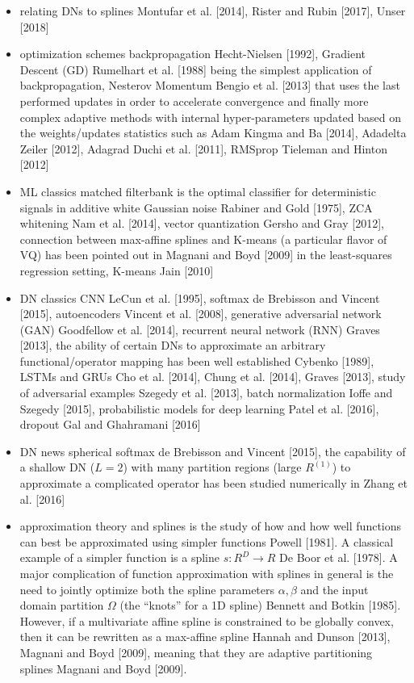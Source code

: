 \documentclass{article}
\begin{document}
\begin{itemize}
	\item relating DNs to splines
		\subitem Montufar et al. [2014], Rister and Rubin [2017], Unser [2018]
	\item optimization schemes
		\subitem backpropagation Hecht-Nielsen [1992], Gradient Descent (GD) Rumelhart et al. [1988] being the simplest application of backpropagation, Nesterov Momentum Bengio et al. [2013] that uses the last performed updates in order to accelerate convergence and finally more complex adaptive methods with internal hyper-parameters updated based on the weights/updates statistics such as Adam Kingma and Ba [2014], Adadelta Zeiler [2012], Adagrad Duchi et al. [2011], RMSprop Tieleman and Hinton [2012]
	\item ML classics
		\subitem matched filterbank is the optimal classifier for deterministic signals in additive white Gaussian noise Rabiner and Gold [1975], ZCA whitening Nam et al. [2014], vector quantization Gersho and Gray [2012], connection between max-affine splines and K-means (a particular flavor of VQ) has been pointed out in Magnani and Boyd [2009] in the least-squares regression setting, K-means Jain [2010]
	\item DN classics
		\subitem CNN LeCun et al. [1995], softmax de Brebisson and Vincent [2015], autoencoders Vincent et al. [2008], generative adversarial network (GAN) Goodfellow et al. [2014], recurrent neural network (RNN) Graves [2013], the ability of certain DNs to approximate an arbitrary functional/operator mapping has been well established Cybenko [1989],  LSTMs and GRUs Cho et al. [2014], Chung et al. [2014], Graves [2013], study of adversarial examples Szegedy et al. [2013], batch normalization Ioffe and Szegedy [2015], probabilistic models for deep learning Patel et al. [2016], dropout Gal and Ghahramani [2016]
	\item DN news
		\subitem spherical softmax  de Brebisson and Vincent [2015], the capability of a shallow DN ($L = 2$) with many partition regions (large $R^{(1)}$) to approximate a complicated operator has been studied numerically in Zhang et al. [2016]
	\item approximation theory and splines
		\subitem is the study of how and how well functions can best be approximated using simpler functions Powell [1981]. A classical example of a simpler function is a spline $s : R^D \rightarrow R$ De Boor et al. [1978]. A major complication of function approximation with splines in general is the need to jointly optimize both the spline parameters $\alpha, \beta$ and the input domain partition $\Omega$ (the ``knots'' for a 1D spline) Bennett and Botkin [1985]. However, if a multivariate affine spline is constrained to be globally convex, then it can be rewritten as a max-affine spline Hannah and Dunson [2013], Magnani and Boyd [2009], meaning that they are adaptive partitioning splines Magnani and Boyd [2009].
\end{itemize}
\end{document}
